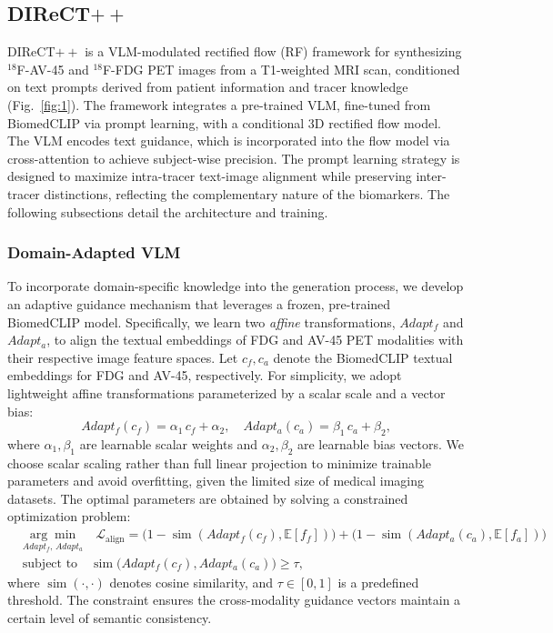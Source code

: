 \documentclass{article}
\begin{document}
\subsection{\texorpdfstring{DIReCT$++$}{DIReCT++}}
DIReCT$++$ is a VLM-modulated rectified flow (RF) framework for synthesizing $^{18}$F-AV-45 and $^{18}$F-FDG PET images from a T1-weighted MRI scan, conditioned on text prompts derived from patient information and tracer knowledge (Fig.~\ref{fig:1}). The framework integrates a pre-trained VLM, fine-tuned from BiomedCLIP via prompt learning, with a conditional 3D rectified flow model. The VLM encodes text guidance, which is incorporated into the flow model via cross-attention to achieve subject-wise precision. The prompt learning strategy is designed to maximize intra-tracer text-image alignment while preserving inter-tracer distinctions, reflecting the complementary nature of the biomarkers. The following subsections detail the architecture and training.

\subsubsection{Domain-Adapted VLM}
To incorporate domain-specific knowledge into the generation process, we develop an adaptive guidance mechanism that leverages a frozen, pre-trained BiomedCLIP model. Specifically, we learn two \textit{affine} transformations, $Adapt_f$ and $Adapt_a$, to align the textual embeddings of FDG and AV-45 PET modalities with their respective image feature spaces. Let $c_f, c_a$ denote the BiomedCLIP textual embeddings for FDG and AV-45, respectively. 
For simplicity, we adopt lightweight affine transformations parameterized by a scalar scale and a vector bias:
\[
Adapt_f(c_f) = \alpha_1 \, c_f + \alpha_2, \quad
Adapt_a(c_a) = \beta_1 \, c_a + \beta_2,
\]
where $\alpha_1, \beta_1 $ are learnable scalar weights and $\alpha_2, \beta_2 $ are learnable bias vectors. We choose scalar scaling rather than full linear projection to minimize trainable parameters and avoid overfitting, given the limited size of medical imaging datasets. The optimal parameters are obtained by solving a constrained optimization problem:
\begin{equation}
\begin{aligned}
& \underset{Adapt_f,\, Adapt_a}{\arg \min} \quad 
   \mathcal{L}_{\text{align}} = \big(1 - \operatorname{sim}(Adapt_f(c_f), \mathbb{E}[f_f])\big) + \big(1 - \operatorname{sim}(Adapt_a(c_a), \mathbb{E}[f_a])\big) \\
& \text{subject to} \quad 
   \operatorname{sim}\big(Adapt_f(c_f), Adapt_a(c_a)\big) \geq \tau,
\end{aligned}
\label{eq:align_opt}
\end{equation}
where $\operatorname{sim}(\cdot, \cdot)$ denotes cosine similarity, and $\tau \in [0,1]$ is a predefined threshold. The constraint ensures the cross-modality guidance vectors maintain a certain level of semantic consistency.
\end{document}

